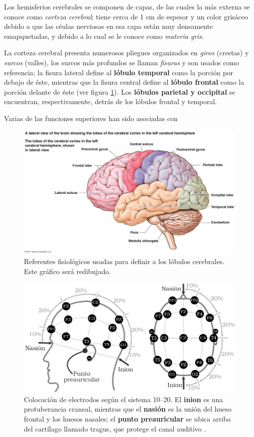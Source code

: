 Los hemisferios cerebrales se componen de capas, de las cuales la más externa se conoce como
\textit{corteza cerebral}; tiene cerca de 1 cm de espesor y un color grisáceo debido a que
las céulas nerviosas en esa capa están muy densamente emapquetadas, y debido a lo cual se le conoce
como \textit{materia gris}.

La corteza cerebral presenta numerosos pliegues organizados en \textit{giros} (crestas) y
\textit{surcos} (valles), los surcos más profundos se llaman \textit{fisuras} y son usados
como referencia;
la fisura lateral define al \textbf{lóbulo temporal} como la porción por debajo de 
éste, mientras que la fisura central define al \textbf{lóbulo frontal} como la
porción delante de éste (ver figura \ref{lobulos}). Los \textbf{lóbulos parietal y occipital}
se encuentran, respectivamente, detrás de los lóbulos frontal y temporal.

Varias de las funciones superiores han sido asociadas con 

\begin{figure}
\centering
\includegraphics[width=0.8\linewidth]{./img_diagramas/brainlandmarks.jpg} 
\caption{Referentes fisiológicos usadas para definir a los lóbulos cerebrales.
Este gráfico será redibujado.
}
\label{lobulos}
\end{figure}

\begin{figure}
\centering
\includegraphics[width=\linewidth]{./img_diagramas/cabeza_proporcionada.pdf} 
\caption{Colocación de electrodos según el sistema 10--20. El \textbf{inion} es 
una protuberancia craneal, mientras que el \textbf{nasión} es la unión del hueso frontal y los 
huesos nasales; el \textbf{punto preauricular} se ubica arriba del cartílago llamado tragus, que 
protege el canal auditivo \cite{Butkov07}. 
}
\label{img1020}
\end{figure}

